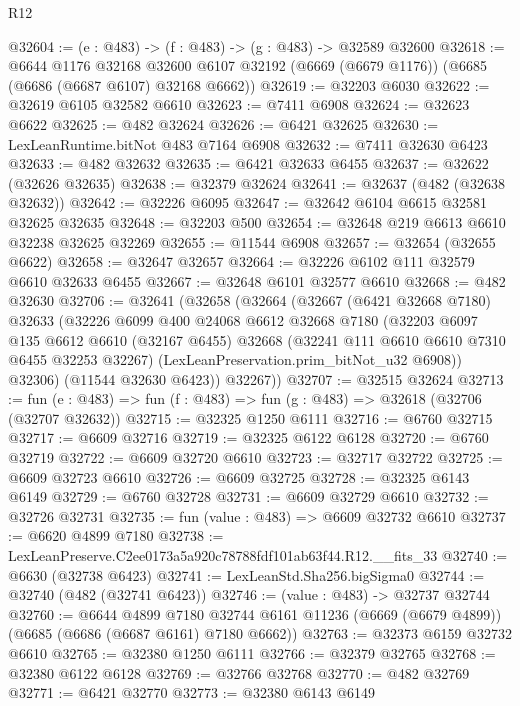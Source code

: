 \begin{lexlean}{R12}
\begin{coremodule}
@32604 := (e : @483) -> (f : @483) -> (g : @483) -> @32589 @32600
@32618 := @6644
    @1176
    @32168
    @32600
    @6107
    @32192
    (@6669 (@6679 @1176))
    (@6685 (@6686 (@6687 @6107) @32168 @6662))
@32619 := @32203 @6030
@32622 := @32619 @6105 @32582 @6610
@32623 := @7411 @6908
@32624 := @32623 @6622
@32625 := @482 @32624
@32626 := @6421 @32625
@32630 := LexLeanRuntime.bitNot @483 @7164 @6908
@32632 := @7411 @32630 @6423
@32633 := @482 @32632
@32635 := @6421 @32633 @6455
@32637 := @32622 (@32626 @32635)
@32638 := @32379 @32624
@32641 := @32637 (@482 (@32638 @32632))
@32642 := @32226 @6095
@32647 := @32642 @6104 @6615 @32581 @32625 @32635
@32648 := @32203 @500
@32654 := @32648 @219 @6613 @6610 @32238 @32625 @32269
@32655 := @11544 @6908
@32657 := @32654 (@32655 @6622)
@32658 := @32647 @32657
@32664 := @32226 @6102 @111 @32579 @6610 @32633 @6455
@32667 := @32648 @6101 @32577 @6610
@32668 := @482 @32630
@32706 := @32641
    (@32658
      (@32664
        (@32667
          (@6421 @32668 @7180)
          @32633
          (@32226
            @6099
            @400
            @24068
            @6612
            @32668
            @7180
            (@32203
              @6097
              @135
              @6612
              @6610
              (@32167 @6455)
              @32668
              (@32241 @111 @6610 @6610 @7310 @6455 @32253 @32267)
              (LexLeanPreservation.prim_bitNot_u32 @6908))
            @32306)
          (@11544 @32630 @6423))
        @32267))
@32707 := @32515 @32624
@32713 := fun (e : @483) => fun (f : @483) => fun (g : @483) => @32618 (@32706 (@32707 @32632))
@32715 := @32325 @1250 @6111
@32716 := @6760 @32715
@32717 := @6609 @32716
@32719 := @32325 @6122 @6128
@32720 := @6760 @32719
@32722 := @6609 @32720 @6610
@32723 := @32717 @32722
@32725 := @6609 @32723 @6610
@32726 := @6609 @32725
@32728 := @32325 @6143 @6149
@32729 := @6760 @32728
@32731 := @6609 @32729 @6610
@32732 := @32726 @32731
@32735 := fun (value : @483) => @6609 @32732 @6610
@32737 := @6620 @4899 @7180
@32738 := LexLeanPreserve.C2ee0173a5a920c78788fdf101ab63f44.R12.__fits_33
@32740 := @6630 (@32738 @6423)
@32741 := LexLeanStd.Sha256.bigSigma0
@32744 := @32740 (@482 (@32741 @6423))
@32746 := (value : @483) -> @32737 @32744
@32760 := @6644
    @4899
    @7180
    @32744
    @6161
    @11236
    (@6669 (@6679 @4899))
    (@6685 (@6686 (@6687 @6161) @7180 @6662))
@32763 := @32373 @6159 @32732 @6610
@32765 := @32380 @1250 @6111
@32766 := @32379 @32765
@32768 := @32380 @6122 @6128
@32769 := @32766 @32768
@32770 := @482 @32769
@32771 := @6421 @32770
@32773 := @32380 @6143 @6149

\end{coremodule}
\end{lexlean}
